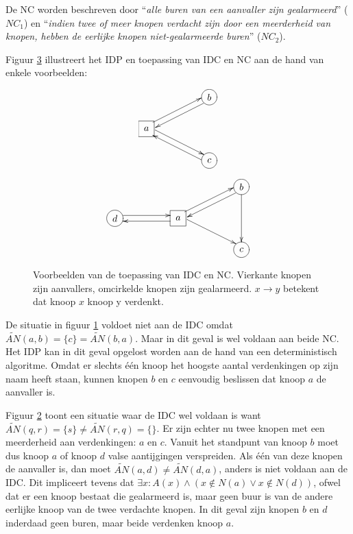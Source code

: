 De NC worden beschreven door ``\emph{alle buren van een aanvaller zijn
gealarmeerd}'' ($NC_1$) en ``\emph{indien twee of meer knopen verdacht zijn door
een meerderheid van knopen, hebben de eerlijke knopen niet-gealarmeerde buren}''
($NC_2$).

Figuur \ref{fig:idp-examples} illustreert het IDP en toepassing van IDC en NC
aan de hand van enkele voorbeelden:

\begin{figure}[ht]
\centering
\begin{subfigure}{.49\textwidth}
  \centering
\[ \entrymodifiers={}
 \xymatrix@!=0.75pc {
 *{}                                      & *{} & *-=++[o][F]{b} \ar@<0.7ex>[dll]\\
 *-=++[F]{a} \ar@<0.7ex>[urr] \ar@<0.7ex>[drr]& *{} & *{}                        \\
 *{}                                      & *{} & *-=++[o][F]{c} \ar@<0.7ex>[ull]\\
 }
\]
  \caption{}
  \label{fig:idp-examples-1}
\end{subfigure}
\begin{subfigure}{.49\textwidth}
  \centering
\[ \entrymodifiers={}
 \xymatrix@!=0.75pc {
 *{} & *{} & *{}                                      & *{} & *-=++[o][F]{b} \ar@<0.7ex>[dll] \ar[dd]\\
 *-=++[o][F]{d} \ar@<0.7ex>[rr] & *{} & *-=++[F]{a} \ar@<0.7ex>[ll] \ar@<0.7ex>[urr] \ar@<0.7ex>[drr]& *{} & *{} \\
 *{} & *{} & *{}                                      & *{} & *-=++[o][F]{c} \\
 }
\]
  \caption{}
  \label{fig:idp-examples-2}
\end{subfigure}
\caption{Voorbeelden van de toepassing van IDC en NC. Vierkante knopen zijn
aanvallers, omcirkelde knopen zijn gealarmeerd. $x \rightarrow y$ betekent dat
knoop $x$ knoop y verdenkt.}
\label{fig:idp-examples}
\end{figure}

De situatie in figuur \ref{fig:idp-examples-1} voldoet niet aan de IDC omdat
$\tilde{AN}(a,b) = \{c\} = \tilde{AN}(b,a)$. Maar in dit geval is wel voldaan
aan beide NC. Het IDP kan in dit geval opgelost worden aan de hand van een
deterministisch algoritme. Omdat er slechts \'e\'en knoop het hoogste aantal
verdenkingen op zijn naam heeft staan, kunnen knopen $b$ en $c$ eenvoudig
beslissen dat knoop $a$ de aanvaller is.

Figuur \ref{fig:idp-examples-2} toont een situatie waar de IDC wel voldaan is
want $\tilde{AN}(q,r) = \{s\} \not= \tilde{AN}(r,q) = \{\}$. Er zijn echter nu
twee knopen met een meerderheid aan verdenkingen: $a$ en $c$. Vanuit het
standpunt van knoop $b$ moet dus knoop $a$ of knoop $d$ valse aantijgingen
verspreiden. Als \'e\'en van deze knopen de aanvaller is, dan moet
$\tilde{AN}(a,d) \not= \tilde{AN}(d,a)$, anders is niet voldaan aan de IDC. Dit
impliceert tevens dat $\exists x : A(x) \wedge ( x \not\in N(a) \vee x \not\in
N(d) )$, ofwel dat er een knoop bestaat die gealarmeerd is, maar geen buur is
van de andere eerlijke knoop van de twee verdachte knopen. In dit geval zijn
knopen $b$ en $d$ inderdaad geen buren, maar beide verdenken knoop $a$.

